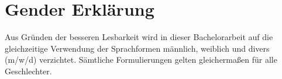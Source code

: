 \thispagestyle{empty}
\section*{\Huge{Gender Erklärung}}

Aus Gründen der besseren Lesbarkeit wird in dieser Bachelorarbeit auf die gleichzeitige Verwendung der Sprachformen männlich,
weiblich und divers (m/w/d) verzichtet. Sämtliche Formulierungen gelten gleichermaßen für alle Geschlechter.
\newpage